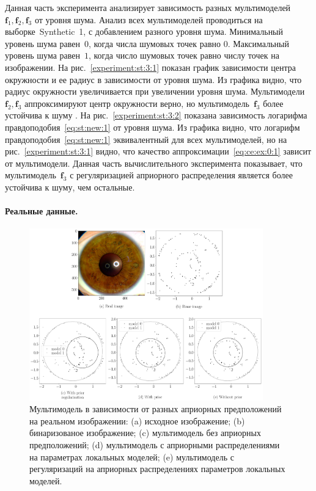 \documentclass[12pt, twoside]{article}
\numberwithin{equation}{section}
\begin{document}
Данная часть эксперимента анализирует зависимость разных мультимоделей~$\textbf{f}_1, \textbf{f}_2, \textbf{f}_3$ от уровня шума. 
Анализ всех мультимоделей проводиться на выборке~Synthetic~1, с добавлением разного уровня шума.
Минимальный уровень шума равен~$0$, когда числа шумовых точек равно $0$. Максимальный уровень шума равен~$1$, когда число шумовых точек равно числу точек на изображении.
На рис.~\ref{experiment:st:3:1} показан график зависимости центра окружности и ее радиус в зависимости от уровня шума. Из графика видно, что радиус окружности увеличивается при увеличении уровня шума. 
Мультимодели~$\textbf{f}_2, \textbf{f}_3$ аппроксимируют центр окружности верно, но мультимодель~$\textbf{f}_3$ более устойчива к шуму .
На рис.~\ref{experiment:st:3:2} показана зависимость логарифма правдоподобия~\eqref{eq:st:new:1} от уровня шума. 
Из графика видно, что логарифм правдоподобия~\eqref{eq:st:new:1} эквивалентный для всех мультимоделей, но на рис.~\ref{experiment:st:3:1} видно, что качество аппроксимации~\eqref{eq:ce:ex:0:1} зависит от мультимодели.
Данная часть вычислительного эксперимента показывает, что мультимодель~$\textbf{f}_3$ с регуляризацией априорного распределения является более устойчива к шуму, чем остальные.

\paragraph{Реальные данные.}
\begin{figure}[h!t]\center
\includegraphics[width=0.9\textwidth]{result_eng/experiment_real_compare}
\caption{Мультимодель в зависимости от разных априорных предположений на реальном изображении: (a) исходное изображение; (b) бинаризованое изображение; (c) мультимодель без априорных предположений; (d) мультимодель с априорными распределениями на параметрах локальных моделей; (e) мультимодель с регуляризаций на априорных распределениях параметров локальных моделей.}
\label{experiment:2}
\end{figure}
\end{document}

